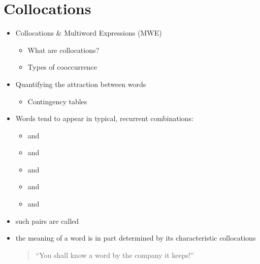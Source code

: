\documentclass[a4paper,landscape,headrule,footrule,xetex]{foils}
\begin{document}
\section{Collocations}




\begin{itemize}
\item Collocations \& Multiword Expressions (MWE)
\begin{itemize}
\item What are collocations?
\item Types of cooccurrence
\end{itemize}
\item Quantifying the attraction between words
\begin{itemize}
\item Contingency tables
\end{itemize}
\end{itemize}


\begin{itemize}
\item Words tend to appear in typical, recurrent combinations:
\begin{itemize}
\item {} and 
\item {} and 
\item {} and 
\item {} and 
\item {} and 
\end{itemize}
\item such pairs are called  \citep{Firth:1957}
\item the meaning of a word is in part determined by its
characteristic collocations
\begin{quote}
``You shall know a word by the company it keeps!''
\end{quote}
\end{itemize}
\end{document}
